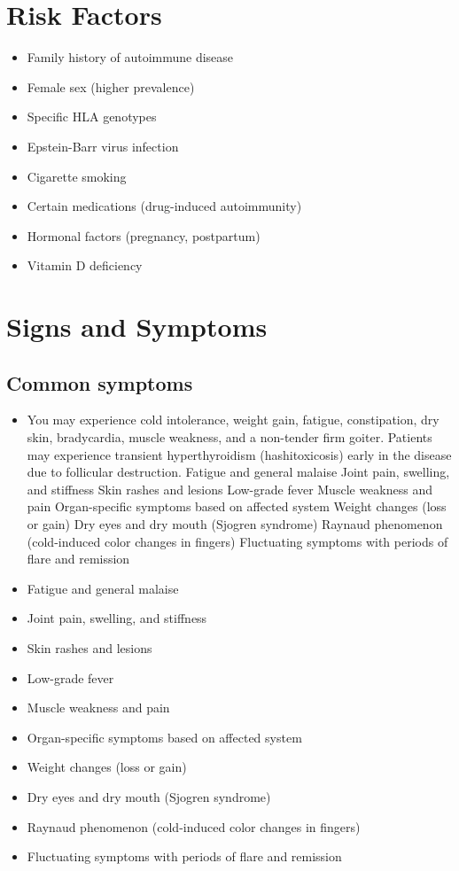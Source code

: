 \section{Risk Factors}


\begin{itemize}[noitemsep]
  \item Family history of autoimmune disease
  \item Female sex (higher prevalence)
  \item Specific HLA genotypes
  \item Epstein-Barr virus infection
  \item Cigarette smoking
  \item Certain medications (drug-induced autoimmunity)
  \item Hormonal factors (pregnancy, postpartum)
  \item Vitamin D deficiency
\end{itemize}
\section{Signs and Symptoms}

\subsection{Common symptoms}
\begin{itemize}[noitemsep]
  \item You may experience cold intolerance, weight gain, fatigue, constipation, dry skin, bradycardia, muscle weakness, and a non-tender firm goiter. Patients may experience transient hyperthyroidism (hashitoxicosis) early in the disease due to follicular destruction. Fatigue and general malaise Joint pain, swelling, and stiffness Skin rashes and lesions Low-grade fever Muscle weakness and pain Organ-specific symptoms based on affected system Weight changes (loss or gain) Dry eyes and dry mouth (Sjogren syndrome) Raynaud phenomenon (cold-induced color changes in fingers) Fluctuating symptoms with periods of flare and remission
  \item Fatigue and general malaise
  \item Joint pain, swelling, and stiffness
  \item Skin rashes and lesions
  \item Low-grade fever
  \item Muscle weakness and pain
  \item Organ-specific symptoms based on affected system
  \item Weight changes (loss or gain)
  \item Dry eyes and dry mouth (Sjogren syndrome)
  \item Raynaud phenomenon (cold-induced color changes in fingers)
  \item Fluctuating symptoms with periods of flare and remission
\end{itemize}

